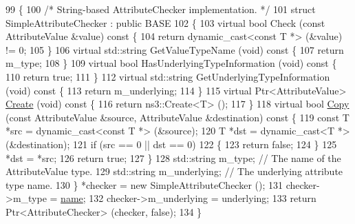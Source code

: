 \begin{DoxyCode}
99 \{
100   \textcolor{comment}{/* String-based AttributeChecker implementation. */}
101   \textcolor{keyword}{struct }SimpleAttributeChecker : \textcolor{keyword}{public} BASE
102   \{
103     \textcolor{keyword}{virtual} \textcolor{keywordtype}{bool} Check (\textcolor{keyword}{const} AttributeValue &value)\textcolor{keyword}{ const }\{
104       \textcolor{keywordflow}{return} \textcolor{keyword}{dynamic\_cast<}\textcolor{keyword}{const }T *\textcolor{keyword}{>} (&value) != 0;
105     \}
106     \textcolor{keyword}{virtual} std::string GetValueTypeName (\textcolor{keywordtype}{void})\textcolor{keyword}{ const }\{
107       \textcolor{keywordflow}{return} m\_type;
108     \}
109     \textcolor{keyword}{virtual} \textcolor{keywordtype}{bool} HasUnderlyingTypeInformation (\textcolor{keywordtype}{void})\textcolor{keyword}{ const }\{
110       \textcolor{keywordflow}{return} \textcolor{keyword}{true};
111     \}
112     \textcolor{keyword}{virtual} std::string GetUnderlyingTypeInformation (\textcolor{keywordtype}{void})\textcolor{keyword}{ const }\{
113       \textcolor{keywordflow}{return} m\_underlying;
114     \}
115     \textcolor{keyword}{virtual} Ptr<AttributeValue> \hyperlink{group__ptr_ga0406dd2d929ceac05ce39d4579fa3e4b}{Create} (\textcolor{keywordtype}{void})\textcolor{keyword}{ const }\{
116       \textcolor{keywordflow}{return} ns3::Create<T> ();
117     \}
118     \textcolor{keyword}{virtual} \textcolor{keywordtype}{bool} \hyperlink{namespacens3_a952d99f6d759fee74dda19f308451bc1}{Copy} (\textcolor{keyword}{const} AttributeValue &source, AttributeValue &destination)\textcolor{keyword}{ const }\{
119       \textcolor{keyword}{const} T *src = \textcolor{keyword}{dynamic\_cast<}\textcolor{keyword}{const }T *\textcolor{keyword}{>} (&source);
120       T *dst = \textcolor{keyword}{dynamic\_cast<}T *\textcolor{keyword}{>} (&destination);
121       \textcolor{keywordflow}{if} (src == 0 || dst == 0)
122         \{
123           \textcolor{keywordflow}{return} \textcolor{keyword}{false};
124         \}
125       *dst = *src;
126       \textcolor{keywordflow}{return} \textcolor{keyword}{true};
127     \}
128     std::string m\_type;        \textcolor{comment}{// The name of the AttributeValue type.}
129     std::string m\_underlying;  \textcolor{comment}{// The underlying attribute type name.}
130   \} *checker = \textcolor{keyword}{new} SimpleAttributeChecker ();
131   checker->m\_type = \hyperlink{generate__test__data__lte__spectrum__model_8m_ab74e6bf80237ddc4109968cedc58c151}{name};
132   checker->m\_underlying = underlying;
133   \textcolor{keywordflow}{return} Ptr<AttributeChecker> (checker, \textcolor{keyword}{false});
134 \}
\end{DoxyCode}


